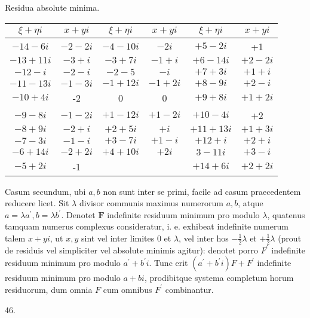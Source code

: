 \documentclass[10pt]{article}
\begin{document}
Residua absolute minima.

\begin{center}
\begin{tabular}{|c|c|c|c|c|c|}
\hline
\(\xi+\eta i\) & \(x+y i\) & \(\xi+\eta i\) & \(x+y i\) & \(\xi+\eta i\) & \(x+y i\) \\
\hline
\(-14-6 i\) & \(-2-2 i\) & \(-4-10 i\) & \(-2 i\) & \(+5-2 i\) & +1 \\
\hline
\(-13+11 i\) & \(-3+i\) & \(-3+7 i\) & \(-1+i\) & \(+6-14 i\) & \(+2-2 i\) \\
\hline
\(-12-i\) & \(-2-i\) & \(-2-5\) & \(-i\) & \(+7+3 i\) & \(+1+i\) \\
\hline
\(-11-13 i\) & \(-1-3 i\) & \(-1+12 i\) & \(-1+2 i\) & \(+8-9 i\) & \(+2-i\) \\
\hline
\(-10+4 i\) & -2 & 0 & 0 & \(+9+8 i\) & \(+1+2 i\) \\
\hline
\(-9-8 i\) & \(-1-2 i\) & \(+1-12 i\) & \(+1-2 i\) & \(+10-4 i\) & +2 \\
\hline
\(-8+9 i\) & \(-2+i\) & \(+2+5 i\) & \(+i\) & \(+11+13 i\) & \(+1+3 i\) \\
\hline
\(-7-3 i\) & \(-1-i\) & \(+3-7 i\) & \(+1-i\) & \(+12+i\) & \(+2+i\) \\
\hline
\(-6+14 i\) & \(-2+2 i\) & \(+4+10 i\) & \(+2 i\) & \(3-11 i\) & \(+3-i\) \\
\hline
\(-5+2 i\) & -1 &  &  & \(+14+6 i\) & \(+2+2 i\) \\
\hline
\end{tabular}
\end{center}

Casum secundum, ubi \(a, b\) non sunt inter se primi, facile ad casum praecedentem reducere licet. Sit \(\lambda\) divisor communis maximus numerorum \(a, b\), atque \(a=\lambda a^{\prime}, b=\lambda b^{\prime}\). Denotet \(\boldsymbol{F}\) indefinite residuum minimum pro modulo \(\lambda\), quatenus tamquam numerus complexus consideratur, i. e. exhibeat indefinite numerum talem \(x+y i\), ut \(x, y\) sint vel inter limites 0 et \(\lambda\), vel inter hos \(-\frac{1}{2} \lambda\) et \(+\frac{1}{2} \lambda\) (prout de residuis vel simpliciter vel absolute minimis agitur): denotet porro \(F^{\prime}\) indefinite residuum minimum pro modulo \(a^{\prime}+b^{\prime} i\). Tunc erit \(\left(a^{\prime}+b^{\prime} i\right) F+F^{\prime}\) indefinite residuum minimum pro modulo \(a+b i\), prodibitque systema completum horum residuorum, dum omnia \(F\) cum omnibus \(F^{\prime}\) combinantur.

46.
\end{document}

